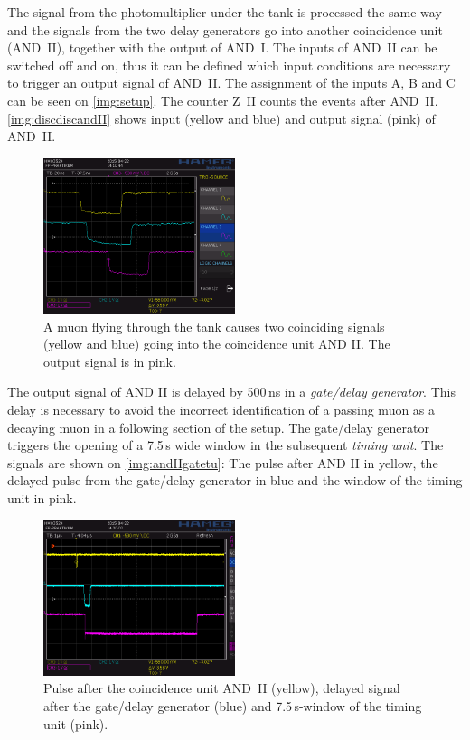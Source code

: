 The signal from the photomultiplier under the tank is processed the same way and
the signals from the two delay generators go into another coincidence unit (AND~II),
together with the output of AND~I. The inputs of AND~II can be switched off and on,
thus it can be defined which input conditions are necessary to trigger an output signal of AND~II.
The assignment of the inputs A, B and C can be seen on \autoref{img:setup}.
The counter Z~II counts the events after AND~II.
\autoref{img:discdiscandII} shows input (yellow and blue) and output signal (pink) of AND~II.

\begin{figure}[H]
\begin{center}
  \includegraphics[width=0.5\textwidth]{../img/S0007.PNG}
  \caption{A muon flying through the tank causes two coinciding signals (yellow and blue) going
  into the coincidence unit AND II. The output signal is in pink.}
  \label{img:discdiscandII}
\end{center}
\end{figure}

The output signal of AND II is delayed by 500\,ns in a \emph{gate/delay generator}.
This delay is necessary to avoid the incorrect identification of a passing muon as a decaying muon
in a following section of the setup.
The gate/delay generator triggers the opening of a 7.5\,\textmu s wide window in the subsequent
\emph{timing unit}.
The signals are shown on \autoref{img:andIIgatetu}: The pulse after AND II in yellow,
the delayed pulse from the gate/delay generator in blue and the window of the timing unit in pink.

\begin{figure}[H]
\begin{center}
  \includegraphics[width=0.5\textwidth]{../img/S0009.PNG}
  \caption{Pulse after the coincidence unit AND~II (yellow), delayed signal after the gate/delay generator (blue)
  and 7.5\,\textmu s-window of the timing unit (pink).}
  \label{img:andIIgatetu}
\end{center}
\end{figure}

